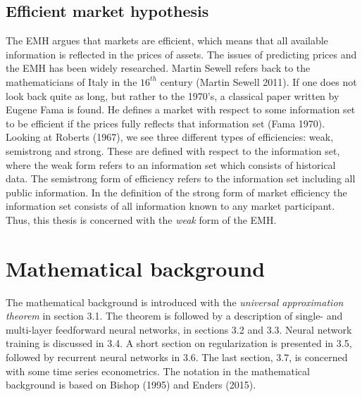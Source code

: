 \documentclass[12pt, letterpaper]{amsart}%
\begin{document}
\subsection{Efficient market hypothesis}
The EMH argues that markets are efficient, which means that all available information is reflected in the prices of assets. The issues of predicting prices and the EMH has been widely researched. Martin Sewell refers back to the mathematicians of Italy in the $16^{th}$ century (Martin Sewell 2011). If one does not look back quite as long, but rather to the 1970's, a classical paper written by Eugene Fama is found. He defines a market with respect to some information set to be efficient if the prices fully reflects that information set (Fama 1970).
\\

Looking at Roberts (1967), we see three different types of efficiencies: weak, semistrong and strong. These are defined with respect to the information set, where the weak form refers to an information set which consists of historical data. The semistrong form of efficiency refers to the information set including all public information. In the definition of the strong form of market efficiency the information set consists of all information known to any market participant. Thus, this thesis is concerned with the \textit{weak} form of the EMH.

\section{Mathematical background}
The mathematical background is introduced with the \textit{universal approximation theorem} in section 3.1. The theorem is followed by a description of single- and multi-layer feedforward neural networks, in sections 3.2 and 3.3. Neural network training is discussed in 3.4. A short section on regularization is presented in 3.5, followed by recurrent neural networks in 3.6. The last section, 3.7, is concerned with some time series econometrics. The notation in the mathematical background is based on Bishop (1995) and Enders (2015).
\end{document}
